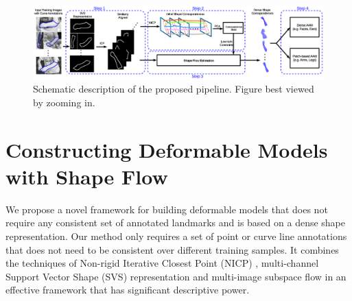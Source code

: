 \begin{figure}[t!]
    \centering
        \includegraphics[width=\textwidth]{resources/architecture3}
    \caption{Schematic description of the proposed pipeline. Figure best viewed by zooming in.}
    \label{fig:archi}
\end{figure}

\section{Constructing Deformable Models with Shape Flow}



We propose a novel framework for building deformable models that does not require any consistent set of annotated landmarks and is based on a dense shape representation. Our method only requires a set of point or curve line annotations that does not need to be consistent over different training samples. It combines the techniques of Non-rigid Iterative Closest Point (NICP) \cite{Amber2007}, multi-channel Support Vector Shape (SVS) \cite{Nguyen2013} representation and multi-image subspace flow \cite{Garg:2013hu} in an effective framework that has significant descriptive power.

